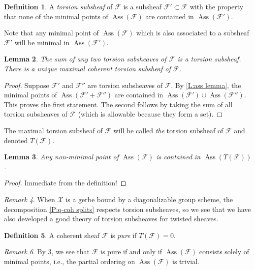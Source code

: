 \documentclass[11pt]{amsart}
\newcommand{\ms}[1]{\mathscr #1}
\renewcommand{\[}{[\!\hspace{0.03em}[}
\renewcommand{\]}{]\!\hspace{0.03em}]}
\renewcommand{\(}{(\!\hspace{0.03em}(}
\renewcommand{\)}{)\!\hspace{0.03em})}
\newtheorem{lem}{Lemma}[subsubsection]%
\theoremstyle{definition}
\newtheorem{defn}[lem]{Definition}
\theoremstyle{remark}
\newtheorem{remark}[lem]{Remark}
\begin{document}
\begin{defn} A \emph{torsion subsheaf\/} of $\ms F$ is a subsheaf 
$\ms F'\subset\ms F$ with the property that none of the minimal 
points of $\operatorname{Ass}(\ms F)$ are contained in 
$\operatorname{Ass}(\ms F')$.
\end{defn}
Note that any minimal point of $\operatorname{Ass}(\ms F)$ which is 
also associated to a subsheaf $\ms F'$ will be minimal in 
$\operatorname{Ass}(\ms F')$.
\begin{lem}\label{L:the torsion subsheaf} The sum of any two torsion subsheaves of $\ms F$ is a 
torsion subsheaf.  There is a unique maximal coherent torsion subsheaf of 
$\ms F$.
\end{lem}
\begin{proof} Suppose $\ms F'$ and $\ms F''$ are torsion subsheaves 
of $\ms F$.  By \ref{L:ass lemma}, the minimal points of $\operatorname{Ass}(\ms F'+\ms 
F'')$ are contained in $\operatorname{Ass}(\ms 
F')\cup\operatorname{Ass}(\ms F'')$.  This proves the first 
statement.  The second follows by taking the sum of all torsion 
subsheaves of $\ms F$ (which is allowable because they form a set).
\end{proof}
The maximal torsion subsheaf of $\ms F$ will be called \emph{the\/} 
torsion subsheaf of $\ms F$ and denoted $T(\ms F)$.
\begin{lem}\label{L:T(F) eats the ass} Any non-minimal point of $\operatorname{Ass}(\ms F)$ is 
contained in $\operatorname{Ass}(T(\ms F))$.
\end{lem}
\begin{proof} Immediate from the definition!
\end{proof}
\begin{remark} When $\ms X$ is a gerbe bound by a diagonalizable group 
scheme, the decomposition \ref{P:q-coh splits} respects torsion 
subsheaves, so we see that we have also developed a good theory of 
torsion subsheaves for twisted sheaves.
\end{remark}

\begin{defn} A coherent sheaf $\ms F$ is \emph{pure\/} if $T(\ms F)=0$.
\end{defn}

\begin{remark} By \ref{L:T(F) eats the ass}, we see that $\ms F$ is 
pure if and only if $\operatorname{Ass}(\ms F)$ consists solely of minimal points, 
i.e., the partial ordering on $\operatorname{Ass}(\ms F)$ is trivial.
\end{remark}
\end{document}
